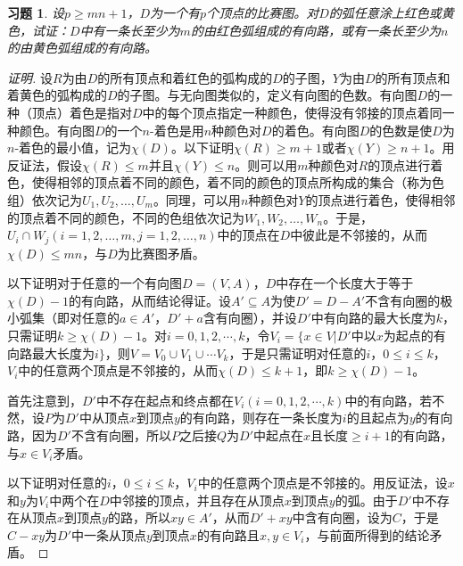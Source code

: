 \documentclass{article}
\begin{document}
\begin{CJK}{UTF8}{gbsn}
\newtheorem*{Exercise}{习题}
\begin{Exercise}
设$p\geq mn+1$，$D$为一个有$p$个顶点的比赛图。对$D$的弧任意涂上红色或黄色，试证：$D$中有一条长至少为$m$的由红色弧组成的有向路，或有一条长至少为$n$的由黄色弧组成的有向路。
\end{Exercise}
\begin{proof}[证明]
  设$R$为由$D$的所有顶点和着红色的弧构成的$D$的子图，$Y$为由$D$的所有顶点和着黄色的弧构成的$D$的子图。与无向图类似的，定义有向图的色数。有向图$D$的一种（顶点）着色是指对$D$中的每个顶点指定一种颜色，使得没有邻接的顶点着同一种颜色。有向图$D$的一个$n$-着色是用$n$种颜色对$D$的着色。有向图$D$的色数是使$D$为$n$-着色的最小值，记为$\chi(D)$。以下证明$\chi(R)\geq m+1$或者$\chi(Y)\geq n+1$。用反证法，假设$\chi(R)\leq m$并且$\chi(Y)\leq n$。则可以用$m$种颜色对$R$的顶点进行着色，使得相邻的顶点着不同的颜色，着不同的颜色的顶点所构成的集合（称为色组）依次记为$U_1,U_2,\ldots,U_m$。同理，可以用$n$种颜色对$Y$的顶点进行着色，使得相邻的顶点着不同的颜色，不同的色组依次记为$W_1,W_2,\ldots,W_n$。于是，$U_i\cap W_j (i=1,2,\ldots,m, j=1,2,\ldots,n)$中的顶点在$D$中彼此是不邻接的，从而$\chi(D)\leq mn$，与$D$为比赛图矛盾。

  以下证明对于任意的一个有向图$D=(V,A)$，$D$中存在一个长度大于等于$\chi(D)-1$的有向路，从而结论得证。设$A'\subseteq A$为使$D'=D-A'$不含有向圈的极小弧集（即对任意的$a\in A'$，$D'+a$含有向圈），并设$D'$中有向路的最大长度为$k$，只需证明$k\geq \chi(D)-1$。对$i=0,1,2,\cdots,k$，令$V_i=\{x\in V|D'$中以$x$为起点的有向路最大长度为$i\}$，则$V=V_0\cup V_1\cup \cdots V_k$，于是只需证明对任意的$i$，$0\leq i \leq k$，$V_i$中的任意两个顶点是不邻接的，从而$\chi(D) \leq k+1$，即$k\geq \chi(D) - 1$。

  首先注意到，$D'$中不存在起点和终点都在$V_i(i=0,1,2,\cdots,k)$中的有向路，若不然，设$P$为$D'$中从顶点$x$到顶点$y$的有向路，则存在一条长度为$i$的且起点为$y$的有向路，因为$D'$不含有向圈，所以$P$之后接$Q$为$D'$中起点在$x$且长度$\geq i+1$的有向路，与$x\in V_i$矛盾。

  以下证明对任意的$i$，$0\leq i \leq k$，$V_i$中的任意两个顶点是不邻接的。用反证法，设$x$和$y$为$V_i$中两个在$D$中邻接的顶点，并且存在从顶点$x$到顶点$y$的弧。由于$D'$中不存在从顶点$x$到顶点$y$的路，所以$xy\in A'$，从而$D'+xy$中含有向圈，设为$C$，于是$C-xy$为$D'$中一条从顶点$y$到顶点$x$的有向路且$x,y\in V_i$，与前面所得到的结论矛盾。
\end{proof}
\end{CJK}
\end{document}
